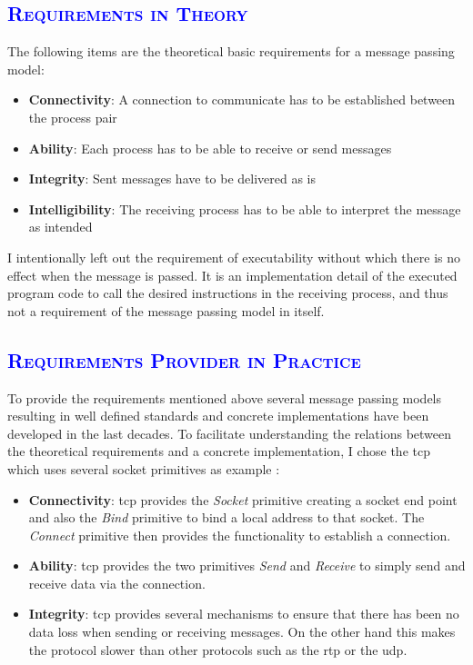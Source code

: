 \documentclass[xcolor=dvipsnames]{article}
\begin{document}
\subsection{\scshape{\textcolor{blue}{Requirements in Theory}}}

\noindent The following items are the theoretical basic requirements for a message passing model:

\begin{itemize}

\item \textbf{Connectivity}: A connection to communicate has to be established between the process pair
\item \textbf{Ability}: Each process has to be able to receive or send messages
\item \textbf{Integrity}: Sent messages have to be delivered as is
\item \textbf{Intelligibility}: The receiving process has to be able to interpret the message as intended

\end{itemize}

\noindent I intentionally left out the requirement of executability without which there is no effect when the message is passed. It is an implementation detail of the executed program code to call the desired instructions in the receiving process, and thus not a requirement of the message passing model in itself.

\subsection{\scshape{\textcolor{blue}{Requirements Provider in Practice}}}

\noindent To provide the requirements mentioned above several message passing models resulting in well defined standards and concrete implementations have been developed in the last decades. To facilitate understanding the relations between the theoretical requirements and a concrete implementation, I chose the \gls{tcp} which uses several socket primitives as example \cite[chap 4.3.1 on p. 141 - 142]{tanenbaum}:

\begin{itemize}

\item \textbf{Connectivity}: \gls{tcp} provides the \textit{Socket} primitive creating a socket end point and also the \textit{Bind} primitive to bind a local address to that socket. The \textit{Connect} primitive then provides the functionality to establish a connection.

\item \textbf{Ability}: \gls{tcp} provides the two primitives \textit{Send} and \textit{Receive} to simply send and receive data via the connection.

\item \textbf{Integrity}: \gls{tcp} provides several mechanisms to ensure that there has been no data loss when sending or receiving messages. On the other hand this makes the protocol slower than other protocols such as the \gls{rtp} or the \gls{udp}.

\end{itemize}
\end{document}
